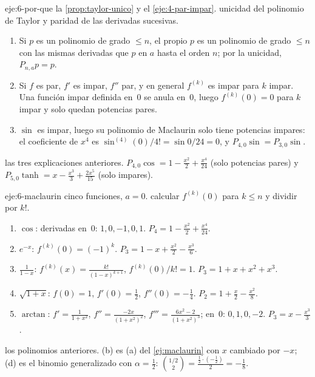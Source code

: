 \begin{solucion}{eje:6-por-que}
\datos la \cref{prop:taylor-unico} y el \cref{eje:4-par-impar}.
\planteamiento unicidad del polinomio de Taylor y paridad de las derivadas sucesivas.
\pasos
\begin{enumerate}[label=\arabic*.]
  \item Si $p$ es un polinomio de grado $\le n$, el propio $p$ es un polinomio de grado $\le n$ con las mismas derivadas que $p$ en $a$ hasta el orden $n$; por la unicidad, $P_{n,a}p=p$.
  \item Si $f$ es par, $f'$ es impar, $f''$ par, y en general $f^{(k)}$ es impar para $k$ impar. Una función impar definida en~0 se anula en~0, luego $f^{(k)}(0)=0$ para $k$ impar y solo quedan potencias pares.
  \item $\sin$ es impar, luego su polinomio de Maclaurin solo tiene potencias impares: el coeficiente de $x^{4}$ es $\sin^{(4)}(0)/4!=\sin0/24=0$, y $P_{4,0}\sin=P_{3,0}\sin$.
\end{enumerate}
\resultado las tres explicaciones anteriores.
\comprobacion $P_{4,0}\cos=1-\frac{x^{2}}{2}+\frac{x^{4}}{24}$ (solo potencias pares) y $P_{5,0}\tanh=x-\frac{x^{3}}{3}+\frac{2x^{5}}{15}$ (solo impares).
\end{solucion}

\begin{solucion}{eje:6-maclaurin}
\datos cinco funciones, $a=0$.
\planteamiento calcular $f^{(k)}(0)$ para $k\le n$ y dividir por $k!$.
\pasos
\begin{enumerate}[label=(\alph*)]
  \item $\cos$: derivadas en~0: $1,0,-1,0,1$. $P_4=1-\frac{x^{2}}{2}+\frac{x^{4}}{24}$.
  \item $e^{-x}$: $f^{(k)}(0)=(-1)^{k}$. $P_3=1-x+\frac{x^{2}}{2}-\frac{x^{3}}{6}$.
  \item $\frac{1}{1-x}$: $f^{(k)}(x)=\frac{k!}{(1-x)^{k+1}}$, $f^{(k)}(0)/k!=1$. $P_3=1+x+x^{2}+x^{3}$.
  \item $\sqrt{1+x}$: $f(0)=1$, $f'(0)=\frac12$, $f''(0)=-\frac14$. $P_2=1+\frac x2-\frac{x^{2}}{8}$.
  \item $\arctan$: $f'=\frac{1}{1+x^{2}}$, $f''=\frac{-2x}{(1+x^{2})^{2}}$, $f'''=\frac{6x^{2}-2}{(1+x^{2})^{3}}$; en~0: $0,1,0,-2$. $P_3=x-\frac{x^{3}}{3}$.
\end{enumerate}
\resultado los polinomios anteriores.
\comprobacion (b) es (a) del \cref{ej:maclaurin} con $x$ cambiado por $-x$; (d) es el binomio generalizado con $\alpha=\frac12$: $\binom{1/2}{2}=\frac{\frac12\cdot(-\frac12)}{2}=-\frac18$.
\end{solucion}

